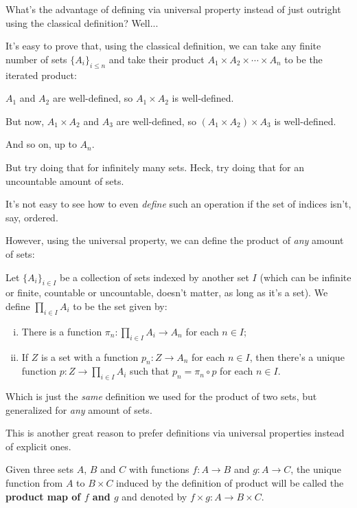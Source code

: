 What's the advantage of defining via universal property instead of just outright using the classical definition? Well...

It's easy to prove that, using the classical definition, we can take any finite number of sets $\{A_i\}_{i\leq n}$ and take their product $A_1\times A_2\times\cdots\times A_n$ to be the iterated product:

\bigskip
$A_1$ and $A_2$ are well-defined, so $A_1\times A_2$ is well-defined.

But now, $A_1\times A_2$ and $A_3$ are well-defined, so $(A_1\times A_2)\times A_3$ is well-defined.

And so on, up to $A_n$.

\bigskip
But try doing that for infinitely many sets. Heck, try doing that for an uncountable amount of sets. 

It's not easy to see how to even \textit{define} such an operation if the set of indices isn't, say, ordered.

However, using the universal property, we can define the product of \textit{any} amount of sets:

\begin{df}
	Let $\{A_i\}_{i\in I}$ be a collection of sets indexed by another set $I$ (which can be infinite or finite, countable or uncountable, doesn't matter, as long as it's a set). We define $\prod_{i\in I}A_i$ to be the set given by:
	\begin{enumerate}[i.]
		\item There is a function $\pi_n:\prod_{i\in I}A_i\to A_n$ for each $n\in I$;
		\item If $Z$ is a set with a function $p_n:Z\to A_n$ for each $n\in I$, then there's a unique function $p:Z\to\prod_{i\in I}A_i$ such that $p_n=\pi_n\circ p$ for each $n\in I$.
	\end{enumerate}
\end{df}

Which is just the \textit{same} definition we used for the product of two sets, but generalized for \textit{any} amount of sets.

This is another great reason to prefer definitions via universal properties instead of explicit ones.

\begin{df}
	Given three sets $A$, $B$ and $C$ with functions $f:A\to B$ and $g:A\to C$, the unique function from $A$ to $B\times C$ induced by the definition of product will be called the \textbf{product map of $f$ and $g$} and denoted by $f\times g:A\to B\times C$.
\end{df}

